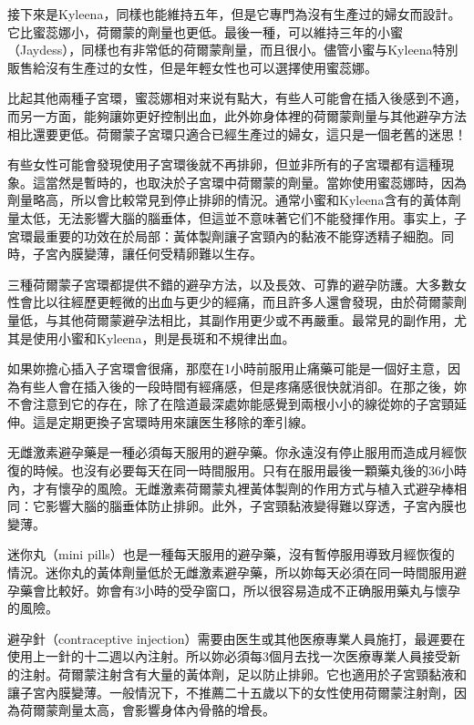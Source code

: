 \documentclass[12pt,UTF8]{ctexbook}
\begin{document}
接下來是Kyleena，同樣也能維持五年，但是它專門為沒有生產过的婦女而設計。它比蜜蕊娜小，荷爾蒙的劑量也更低。最後一種，可以維持三年的小蜜（Jaydess），同樣也有非常低的荷爾蒙劑量，而且很小。儘管小蜜与Kyleena特別販售給沒有生產过的女性，但是年輕女性也可以選擇使用蜜蕊娜。

比起其他兩種子宮環，蜜蕊娜相对来说有點大，有些人可能會在插入後感到不適，而另一方面，能夠讓妳更好控制出血，此外妳身体裡的荷爾蒙劑量与其他避孕方法相比還要更低。荷爾蒙子宮環只適合已經生產过的婦女，這只是一個老舊的迷思！

有些女性可能會發現使用子宮環後就不再排卵，但並非所有的子宮環都有這種現象。這當然是暫時的，也取決於子宮環中荷爾蒙的劑量。當妳使用蜜蕊娜時，因為劑量略高，所以會比較常見到停止排卵的情況。通常小蜜和Kyleena含有的黃体劑量太低，无法影響大腦的腦垂体，但這並不意味著它们不能發揮作用。事实上，子宮環最重要的功效在於局部：黃体製劑讓子宮頸內的黏液不能穿透精子細胞。同時，子宮內膜變薄，讓任何受精卵難以生存。

三種荷爾蒙子宮環都提供不錯的避孕方法，以及長效、可靠的避孕防護。大多數女性會比以往經歷更輕微的出血与更少的經痛，而且許多人還會發現，由於荷爾蒙劑量低，与其他荷爾蒙避孕法相比，其副作用更少或不再嚴重。最常見的副作用，尤其是使用小蜜和Kyleena，則是長斑和不規律出血。

如果妳擔心插入子宮環會很痛，那麼在1小時前服用止痛藥可能是一個好主意，因為有些人會在插入後的一段時間有經痛感，但是疼痛感很快就消卻。在那之後，妳不會注意到它的存在，除了在陰道最深處妳能感覺到兩根小小的線從妳的子宮頸延伸。這是定期更換子宮環時用來讓医生移除的牽引線。

无雌激素避孕藥是一種必須每天服用的避孕藥。你永遠沒有停止服用而造成月經恢復的時候。也沒有必要每天在同一時間服用。只有在服用最後一顆藥丸後的36小時內，才有懷孕的風險。无雌激素荷爾蒙丸裡黃体製劑的作用方式与植入式避孕棒相同：它影響大腦的腦垂体防止排卵。此外，子宮頸黏液變得難以穿透，子宮內膜也變薄。

迷你丸（mini pills）也是一種每天服用的避孕藥，沒有暫停服用導致月經恢復的情況。迷你丸的黃体劑量低於无雌激素避孕藥，所以妳每天必須在同一時間服用避孕藥會比較好。妳會有3小時的受孕窗口，所以很容易造成不正确服用藥丸与懷孕的風險。





避孕針（contraceptive injection）需要由医生或其他医療專業人員施打，最遲要在使用上一針的十二週以內注射。所以妳必須每3個月去找一次医療專業人員接受新的注射。荷爾蒙注射含有大量的黃体劑，足以防止排卵。它也適用於子宮頸黏液和讓子宮內膜變薄。一般情況下，不推薦二十五歲以下的女性使用荷爾蒙注射劑，因為荷爾蒙劑量太高，會影響身体內骨骼的增長。
\end{document}
